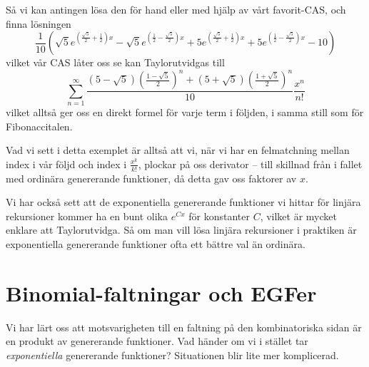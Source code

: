 \documentclass[nobib]{tufte-handout}
\begin{document}
\begin{example}
  Så vi kan antingen lösa den för hand eller med hjälp av vårt favorit-CAS, och finna lösningen
  $$\frac{1}{10} \left(\sqrt{5} e^{\left(\frac{\sqrt{5}}{2}+\frac{1}{2}\right) x}-\sqrt{5} e^{\left(\frac{1}{2}-\frac{\sqrt{5}}{2}\right) x}+5 e^{\left(\frac{\sqrt{5}}{2}+\frac{1}{2}\right) x}+5 e^{\left(\frac{1}{2}-\frac{\sqrt{5}}{2}\right) x}-10\right)$$
  vilket vår CAS låter oss se kan Taylorutvidgas till
  $$\sum_{n=1}^{\infty} \frac{\left(5 - \sqrt{5}\right) \left(\frac{1 - \sqrt{5}}{2}\right)^n + \left(5 + \sqrt{5}\right) \left(\frac{1 + \sqrt{5}}{2}\right)^n}{10} \frac{x^n}{n!}$$
  vilket alltså ger oss en direkt formel för varje term i följden, i samma still som för Fibonaccitalen.
\end{example}

Vad vi sett i detta exemplet är alltså att vi, när vi har en felmatchning mellan index i vår följd och index i $\frac{x^k}{k!}$, plockar på oss derivator -- till skillnad från i fallet med ordinära genererande funktioner, då detta gav oss faktorer av $x$.

Vi har också sett att de exponentiella genererande funktioner vi hittar för linjära rekursioner kommer ha en bunt olika $e^{Cx}$ för konstanter $C$, vilket är mycket enklare att Taylorutvidga. Så om man vill lösa linjära rekursioner i praktiken är exponentiella genererande funktioner ofta ett bättre val än ordinära.

\section{Binomial-faltningar och EGFer}

Vi har lärt oss att motsvarigheten till en faltning på den kombinatoriska sidan är en produkt av genererande funktioner. Vad händer om vi i stället tar \emph{exponentiella} genererande funktioner? Situationen blir lite mer komplicerad.
\end{document}
